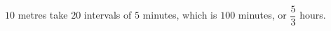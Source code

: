 $10$ metres take $20$ intervals of $5$ minutes, which is $100$ minutes, or $\boxed{\dfrac53}$ hours.
